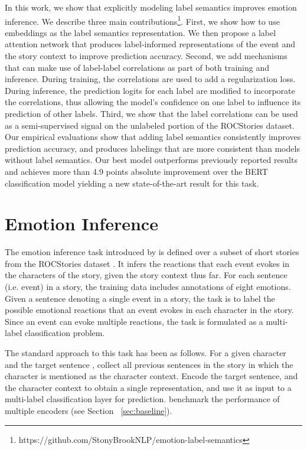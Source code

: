 \documentclass[11pt,a4paper]{article}
\begin{document}
In this work, we show that explicitly modeling label semantics improves emotion inference. We describe three main contributions\footnote{https://github.com/StonyBrookNLP/emotion-label-semantics}. First, we show how to use embeddings as the label semantics representation. We then propose a label attention network that produces label-informed representations of the event and the story context to improve prediction accuracy. Second, we add mechanisms that can make use of label-label correlations as part of both training and inference. During training, the correlations are used to add a regularization loss. During inference, the prediction logits for each label are modified to incorporate the correlations, thus allowing the model's confidence on one label to influence its prediction of other labels. Third, we show that the label correlations can be used as a semi-supervised signal on the unlabeled portion of the ROCStories dataset.\\
Our empirical evaluations show that adding label semantics consistently improves prediction accuracy, and produces labelings that are more consistent than models without label semantics. Our best model outperforms previously reported results and achieves more than 4.9 points absolute improvement over the BERT classification model yielding a new state-of-the-art result for this task. \section{Emotion Inference}
The emotion inference task introduced by \citet{rashkin2018modeling} is defined over a subset of short stories from the ROCStories dataset \cite{mostafazadeh2016corpus}. It infers the reactions that each event evokes in the characters of the story, given the story context thus far. For each sentence (i.e. event) in a story, the training data includes annotations of eight emotions. Given a sentence  denoting a single event in a story, the task is to label the possible emotional reactions that an event evokes in each character in the story. Since an event can evoke multiple reactions, the task is formulated as a multi-label classification problem.

The standard approach to this task has been as follows. For a given character  and the target sentence , collect all previous sentences  in the story in which the character  is mentioned as the character context. Encode the target sentence, and the character context to obtain a single representation, and use it as input to a multi-label classification layer for prediction. \citet{rashkin2018modeling} benchmark the performance of multiple encoders (see Section~ \ref{sec:baseline}).
\end{document}
